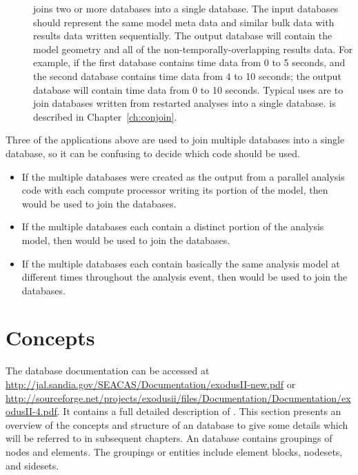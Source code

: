 \begin{description}
\item[\conjoin] joins two or more \exo{} databases into a single
database. The input databases should represent the same model meta
data and similar bulk data with results data written sequentially. The
output database will contain the model geometry and all of the
non-temporally-overlapping results data. For example, if the first
database contains time data from 0 to 5 seconds, and the second
database contains time data from 4 to 10 seconds; the output database
will contain time data from 0 to 10 seconds.  Typical uses are to join
databases written from restarted analyses into a single database.
\conjoin{} is described in Chapter~\ref{ch:conjoin}. 
\end{description}

Three of the applications above are used to join multiple \exo{}
databases into a single \exo{} database, so it can be confusing to
decide which code should be used.
\begin{itemize}
\item If the multiple \exo{} databases were created as the output from a
parallel analysis code with each compute processor writing its portion
of the model, then \epu{} would be used to join the databases.

\item If the multiple \exo{} databases each contain a distinct portion of the
analysis model, then \ejoin{} would be used to join the databases.

\item If the multiple \exo{} databases each contain basically the same
analysis model at different times throughout the analysis event, then
\conjoin{} would be used to join the databases.

\end{itemize}

\section{\exo{} Concepts}
The \exo{} database documentation can be accessed at
\url{http://jal.sandia.gov/SEACAS/Documentation/exodusII-new.pdf} or \url{http://sourceforge.net/projects/exodusii/files/Documentation/Documentation/exodusII-4.pdf}. It
contains a full detailed description of \exo{}. This section presents
an overview of the concepts and structure of an \exo{} database to give some
details which will be referred to in subsequent chapters. An \exo{}
database contains groupings of nodes and elements.  The groupings or
entities include element blocks, nodesets, and sidesets.

